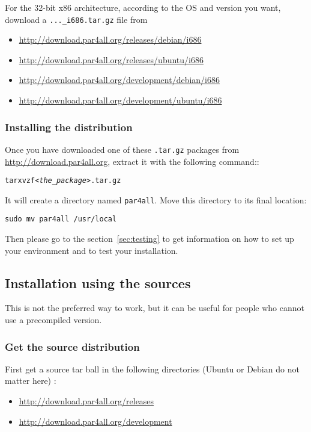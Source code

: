 \documentclass[a4paper]{article}
\begin{document}
For the 32-bit x86 architecture, according to the OS and version you want,
download a \texttt{...\_i686.tar.gz} file from
\begin{itemize}
\item \protect\url{http://download.par4all.org/releases/debian/i686}
\item \protect\url{http://download.par4all.org/releases/ubuntu/i686}
\item \protect\url{http://download.par4all.org/development/debian/i686}
\item \protect\url{http://download.par4all.org/development/ubuntu/i686}
\end{itemize}


\subsubsection{Installing the distribution}

Once you have downloaded one of these \texttt{.tar.gz} packages from
\url{http://download.par4all.org}, extract it with the following command::
\begin{alltt}
tar xvzf \emph{<the_package>}.tar.gz
\end{alltt}

It will create a directory named \texttt{par4all}. Move this directory to its final
location:
\begin{verbatim}
sudo mv par4all /usr/local
\end{verbatim}

Then please go to the section~\ref{sec:testing} to get information on how
to set up your environment and to test your installation.


\subsection{Installation using the sources}

This is not the preferred way to work, but it can be useful for people who
cannot use a precompiled version.


\subsubsection{Get the source distribution}
First get a source tar ball in the following directories (Ubuntu or Debian
do not matter here) :
\begin{itemize}
\item \protect\url{http://download.par4all.org/releases}
\item \protect\url{http://download.par4all.org/development}
\end{itemize}
\end{document}
